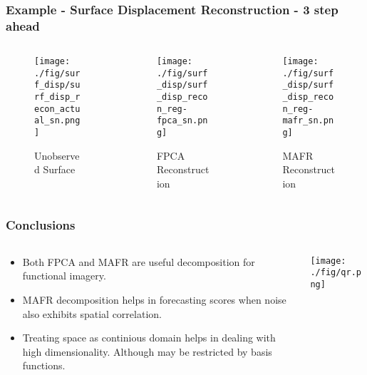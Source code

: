 \documentclass[aspectratio=169]{beamer}
\begin{document}
  \begin{frame}
    \frametitle{Example - Surface Displacement Reconstruction - 3 step ahead}
    \begin{columns}[t]
      \begin{column}{.33\textwidth}
      \begin{figure}
        \texttt{[image: ./fig/surf\_disp/surf\_disp\_recon\_actual\_sn.png]}
      \caption{Unobserved Surface}
      \end{figure}
      \end{column}
      \begin{column}{.33\textwidth}
      \begin{figure}
      \texttt{[image: ./fig/surf\_disp/surf\_disp\_recon\_reg-fpca\_sn.png]}
      \caption{FPCA Reconstruction}
      \end{figure}
      \end{column}
      \begin{column}{.33\textwidth}
      \begin{figure}
      \texttt{[image: ./fig/surf\_disp/surf\_disp\_recon\_reg-mafr\_sn.png]}
      \caption{MAFR Reconstruction}
      \end{figure}
      \end{column}
    \end{columns}
  \end{frame}
  

  \begin{frame}
    \frametitle{Conclusions}
    \begin{columns}
      \begin{column}{0.5\textwidth}
        \begin{itemize}
          \item Both FPCA and MAFR are useful decomposition for functional imagery.
          \item MAFR decomposition helps in forecasting scores when noise also exhibits spatial correlation. 
          \item Treating space as continious domain helps in dealing with high dimensionality. Although may be restricted by basis functions. 
        \end{itemize}
      \end{column}
      \begin{column}{0.5\textwidth}
        \begin{center}
          \texttt{[image: ./fig/qr.png]}
        \end{center}
      \end{column}
    \end{columns}
    
  \end{frame}
  
\end{document}
